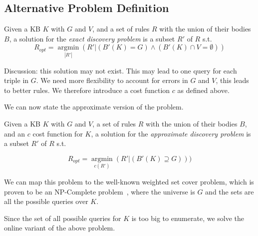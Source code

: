 \subsection{Alternative Problem Definition}

Given a KB $K$ with $G$ and $V$, and a set of rules $R$ with the union of their bodies $B$, 
a solution for the \emph{exact discovery problem} is a subset $R'$ of $R$  s.t.
$$R_{opt}=\underset{|R'|}{\operatorname{argmin}}(R'|(B'(K) = G) \wedge (B'(K) \cap V = \emptyset) )$$

Discussion: this solution may not exist. This may lead to one query for each triple in $G$. We need more flexibility to account for errors in $G$ and $V$, this leads to better rules. We therefore introduce a cost function $c$ as defined above. 

We can now state the approximate version of the problem.


Given a KB $K$ with $G$ and $V$, a set of rules $R$ with the union of their bodies $B$, and an $c$ cost function for $K$,
a solution for the \emph{approximate discovery problem} is a subset $R'$ of $R$  s.t.

$$R_{opt}=\underset{c(R')}{\operatorname{argmin}}(R'|(B'(K) \supseteq G)) )$$


We can map this problem to the well-known weighted set cover problem, which is proven to be an NP-Complete problem~\cite{chvatal1979greedy}, where the universe is $G$ and the sets are all the possible queries over $K$.

Since the set of all possible queries for $K$ is too big to enumerate, we solve the online variant of the above problem. 



